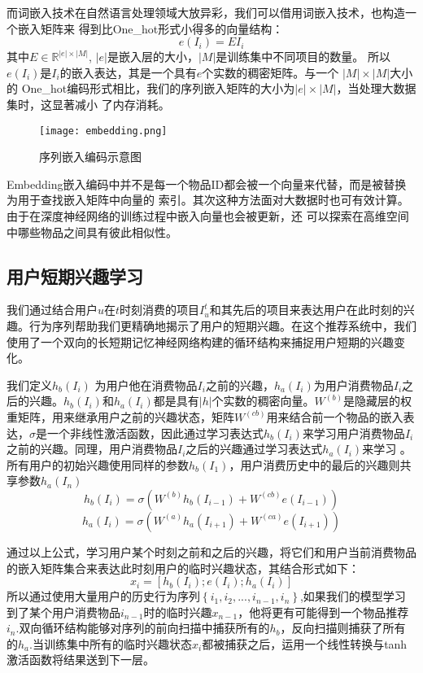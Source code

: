 而词嵌入技术在自然语言处理领域大放异彩，我们可以借用词嵌入技术，也构造一个嵌入矩阵来%
得到比One\_hot形式小得多的向量结构：
$$
e(I_i) = EI_i
$$
其中$E\in \mathbb{R}^{|e|\times |M|}$, $|e|$是嵌入层的大小，$|M|$是训练集中不同项目的数量。%
所以$e(I_i)$是$I_i$的嵌入表达，其是一个具有$e$个实数的稠密矩阵。与一个 $|M|\times |M|$大小的%
One\_hot编码形式相比，我们的序列嵌入矩阵的大小为$|e|\times |M|$，当处理大数据集时，这显著减小%
了内存消耗。
\begin{figure}[htb]
  \centering
  \texttt{[image: embedding.png]}\\
  \caption{序列嵌入编码示意图}
  \label{fig:embedding}
\end{figure}
Embedding嵌入编码中并不是每一个物品ID都会被一个向量来代替，而是被替换为用于查找嵌入矩阵中向量的%
索引。其次这种方法面对大数据时也可有效计算。由于在深度神经网络的训练过程中嵌入向量也会被更新，还%
可以探索在高维空间中哪些物品之间具有彼此相似性。

\subsection{用户短期兴趣学习}

我们通过结合用户$u$在$t$时刻消费的项目$I_{u}^{t}$和其先后的项目来表达用户在此时刻的兴趣。行为序列帮助我们更精确地揭示了用户的短期兴趣。在这个推荐系统中，我们使用了一个双向的长短期记忆神经网络构建的循环结构来捕捉用户短期的兴趣变化。

我们定义$h_{b}(I_{i})$ 为用户他在消费物品$I_i$之前的兴趣，$h_{a}(I_{i})$为用户消费物品$I_i$之后的兴趣。$h_{b}(I_{i})$和$h_{a}(I_{i})$都是具有$|h|$个实数的稠密向量。$W^{(b)}$是隐藏层的权重矩阵，用来继承用户之前的兴趣状态，矩阵$W^{(cb)}$用来结合前一个物品的嵌入表达，$\sigma$是一个非线性激活函数，因此通过学习表达式$h_{b}(I_{i})$来学习用户消费物品$I_i$之前的兴趣。同理，用户消费物品$I_i$之后的兴趣通过学习表达式$h_{a}(I_{i})$来学习
。所有用户的初始兴趣使用同样的参数$h_{b}(I_{1})$，用户消费历史中的最后的兴趣则共享参数$h_{a}(I_{n})$
$$
h_{b}(I_{i})=\sigma (W^{(b)}h_{b}(I_{i-1})+W^{(cb)}e(I_{i-1}))
$$
$$
h_{a}(I_{i})=\sigma (W^{(a)}h_{a}(I_{i+1})+W^{(ca)}e(I_{i+1}))
$$

通过以上公式，学习用户某个时刻之前和之后的兴趣，将它们和用户当前消费物品的嵌入矩阵集合来表达此时刻用户的临时兴趣状态，其结合形式如下：
$$
x_{i}=[h_{b}(I_{i});e(I_{i});h_{a}(I_{i})]
$$
所以通过使用大量用户的历史行为序列$\left \{ i_{1},i_{2},...,i_{n-1},i_{n} \right \}$,如果我们的模型学习到了某个用户消费物品$i_{n-1}$时的临时兴趣$x_{n-1}$，他将更有可能得到一个物品推荐$i_{n}$.双向循环结构能够对序列的前向扫描中捕获所有的$h_b$，反向扫描则捕获了所有的$h_a$.当训练集中所有的临时兴趣状态$x_i$都被捕获之后，运用一个线性转换与tanh激活函数将结果送到下一层。

